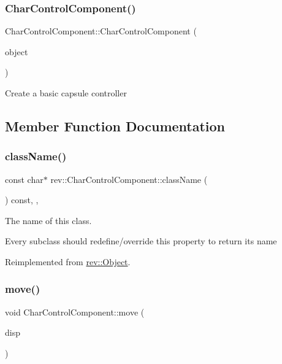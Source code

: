 \subsubsection{\texorpdfstring{CharControlComponent()}{CharControlComponent()}}
{\footnotesize\ttfamily Char\+Control\+Component\+::\+Char\+Control\+Component (\begin{DoxyParamCaption}\item[{const std\+::shared\+\_\+ptr$<$ \mbox{\hyperlink{classrev_1_1_scene_object}{Scene\+Object}} $>$ \&}]{object }\end{DoxyParamCaption})}

Create a basic capsule controller 

\subsection{Member Function Documentation}
\mbox{\label{classrev_1_1_char_control_component_ad48e482237a727ae8e07a3e2487a0fcb}} 
\subsubsection{\texorpdfstring{className()}{className()}}
{\footnotesize\ttfamily const char$\ast$ rev\+::\+Char\+Control\+Component\+::class\+Name (\begin{DoxyParamCaption}{ }\end{DoxyParamCaption}) const\hspace{0.3cm}{\ttfamily [inline]}, {\ttfamily [override]}, {\ttfamily [virtual]}}



The name of this class. 

Every subclass should redefine/override this property to return its name 

Reimplemented from \mbox{\hyperlink{classrev_1_1_object_a7a2013f91169479b65cf93afdc5d9a68}{rev\+::\+Object}}.

\mbox{\label{classrev_1_1_char_control_component_a7af709870507cde2ad2151c0e510e2c6}} 
\subsubsection{\texorpdfstring{move()}{move()}}
{\footnotesize\ttfamily void Char\+Control\+Component\+::move (\begin{DoxyParamCaption}\item[{const \mbox{\hyperlink{classrev_1_1_vector}{Vector}}$<$ real\+\_\+g, 3 $>$ \&}]{disp }\end{DoxyParamCaption})}



